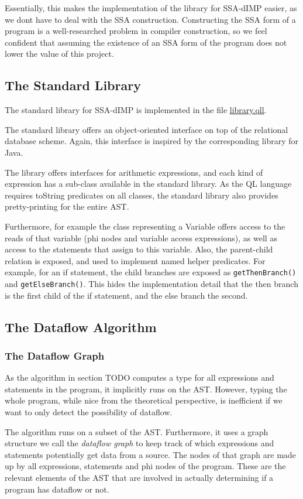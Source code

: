 Essentially, this makes the implementation of the library for SSA-dIMP easier,
as we dont have to deal with the SSA construction.
Constructing the SSA form of a program is a well-researched problem in compiler
construction, so we feel confident that assuming the existence of an SSA form 
of the program does not lower the value of this project.

\subsection{The Standard Library}
The standard library for SSA-dIMP is implemented in the file \hyperref[lst:library]{library.qll}.

The standard library offers an object-oriented interface on top of the relational
database scheme.
Again, this interface is inspired by the corresponding library for Java.

The library offers interfaces for arithmetic expressions, and each kind of expression
has a sub-class available in the standard library.
As the QL language requires toString predicates on all classes,
the standard library also provides pretty-printing for the entire AST.

Furthermore, for example the class representing a Variable offers access to the
reads of that variable (phi nodes and variable access expressions), as well
as access to the statements that assign to this variable.
Also, the parent-child relation is exposed, and used to implement named helper predicates.
For example, for an if statement, the child branches are exposed as \texttt{getThenBranch()}
and \texttt{getElseBranch()}.
This hides the implementation detail that the then branch is the first child of the
if statement, and the else branch the second.

\subsection{The Dataflow Algorithm}
\subsubsection*{The Dataflow Graph}
As the algorithm in section TODO computes a type for all expressions and statements in the program,
it implicitly runs on the AST.
However, typing the whole program, while nice from the theoretical perspective, is 
inefficient if we want to only detect the possibility of dataflow.

The algorithm runs on a subset of the AST.
Furthermore, it uses a graph structure we call the \emph{dataflow graph} to keep
track of which expressions and statements potentially get data from a source.
The nodes of that graph are made up by all expressions, statements and phi nodes of the program.
These are the relevant elements of the AST that are involved in actually determining
if a program has dataflow or not.

